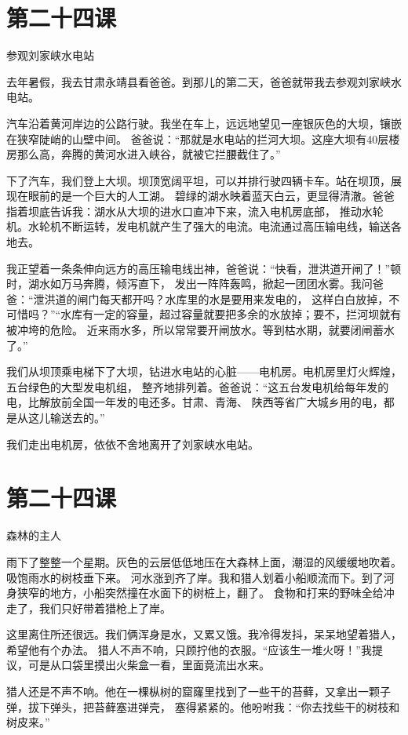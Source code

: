 \documentclass[12pt,UTF8]{ctexbook}
\begin{document}
\section{第二十四课}

参观刘家峡水电站

去年暑假，我去甘肃永靖县看爸爸。到那儿的第二天，爸爸就带我去参观刘家峡水电站。

汽车沿着黄河岸边的公路行驶。我坐在车上，远远地望见一座银灰色的大坝，镶嵌在狭窄陡峭的山壁中间。
爸爸说：“那就是水电站的拦河大坝。这座大坝有40层楼房那么高，奔腾的黄河水进入峡谷，就被它拦腰截住了。”

下了汽车，我们登上大坝。坝顶宽阔平坦，可以并排行驶四辆卡车。站在坝顶，展现在眼前的是一个巨大的人工湖。
碧绿的湖水映着蓝天白云，更显得清澈。爸爸指着坝底告诉我：湖水从大坝的进水口直冲下来，流入电机房底部，
推动水轮机。水轮机不断运转，发电机就产生了强大的电流。电流通过高压输电线，输送各地去。

我正望着一条条伸向远方的高压输电线出神，爸爸说：“快看，泄洪道开闸了！”顿时，湖水如万马奔腾，倾泻直下，
发出一阵阵轰鸣，掀起一团团水雾。我问爸爸：“泄洪道的闸门每天都开吗？水库里的水是要用来发电的，
这样白白放掉，不可惜吗？”“水库有一定的容量，超过容量就要把多余的水放掉；要不，拦河坝就有被冲垮的危险。
近来雨水多，所以常常要开闸放水。等到枯水期，就要闭闸蓄水了。”

我们从坝顶乘电梯下了大坝，钻进水电站的心脏——电机房。电机房里灯火辉煌，五台绿色的大型发电机组，
整齐地排列着。爸爸说：“这五台发电机给每年发的电，比解放前全国一年发的电还多。甘肃、青海、
陕西等省广大城乡用的电，都是从这儿输送去的。”

我们走出电机房，依依不舍地离开了刘家峡水电站。

\section{第二十四课}

森林的主人

雨下了整整一个星期。灰色的云层低低地压在大森林上面，潮湿的风缓缓地吹着。吸饱雨水的树枝垂下来。
河水涨到齐了岸。我和猎人划着小船顺流而下。到了河身狭窄的地方，小船突然撞在水面下的树桩上，翻了。
食物和打来的野味全给冲走了，我们只好带着猎枪上了岸。

这里离住所还很远。我们俩浑身是水，又累又饿。我冷得发抖，呆呆地望着猎人，希望他有个办法。
猎人不声不响，只顾拧他的衣服。“应该生一堆火呀！”我提议，可是从口袋里摸出火柴盒一看，里面竟流出水来。

猎人还是不声不响。他在一棵枞树的窟窿里找到了一些干的苔藓，又拿出一颗子弹，拔下弹头，把苔藓塞进弹壳，
塞得紧紧的。他吩咐我：“你去找些干的树枝和树皮来。”
\end{document}
